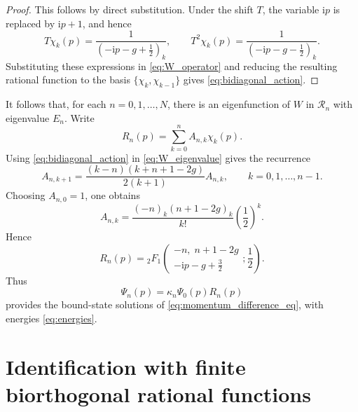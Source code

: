\documentclass[11pt,reqno]{amsart}
\newcommand{\ii}{\mathrm{i}}
\newcommand{\cR}{\mathcal{R}}
\numberwithin{equation}{section}
\begin{document}
\begin{proof}
This follows by direct substitution.  Under the shift $T$, the variable $\ii p$ is replaced by
$\ii p+1$, and hence
\begin{equation}
  T\chi_k(p)=\frac{1}{\left(-\ii p-g+\frac12\right)_k},
  \qquad
  T^2\chi_k(p)=\frac{1}{\left(-\ii p-g-\frac12\right)_k}.
\end{equation}
Substituting these expressions in \eqref{eq:W_operator} and reducing the resulting rational
function to the basis $\{\chi_k,\chi_{k-1}\}$ gives \eqref{eq:bidiagonal_action}.
\end{proof}

It follows that, for each $n=0,1,\dots,N$, there is an eigenfunction of $W$ in $\cR_n$ with
eigenvalue $E_n$.  Write
\begin{equation}
  R_n(p)=\sum_{k=0}^{n} A_{n,k}\chi_k(p).
  \label{eq:R_expansion}
\end{equation}
Using \eqref{eq:bidiagonal_action} in \eqref{eq:W_eigenvalue} gives the recurrence
\begin{equation}
  A_{n,k+1}
  =\frac{(k-n)(k+n+1-2g)}{2(k+1)}A_{n,k},
  \qquad k=0,1,\dots,n-1.
  \label{eq:A_recurrence}
\end{equation}
Choosing $A_{n,0}=1$, one obtains
\begin{equation}
  A_{n,k}=\frac{(-n)_k(n+1-2g)_k}{k!}\left(\frac12\right)^k.
  \label{eq:A_coefficients}
\end{equation}
Hence
\begin{equation}
  R_n(p)=
  {}_2F_1\!\left(
  \begin{matrix}
  -n,\; n+1-2g\\
  -\ii p-g+\frac32
  \end{matrix};\frac12
  \right).
  \label{eq:R_hypergeometric}
\end{equation}
Thus
\begin{equation}
  \Psi_n(p)=\kappa_n\Psi_0(p)R_n(p)
  \label{eq:Psi_R_solution}
\end{equation}
provides the bound-state solutions of \eqref{eq:momentum_difference_eq}, with energies
\eqref{eq:energies}.

\section{Identification with finite biorthogonal rational functions}\label{sec:kmj}
\end{document}
